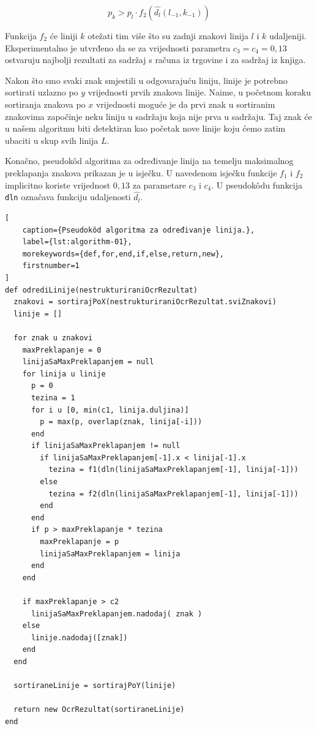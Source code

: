 \documentclass[times, utf8, zavrsni]{fer}
\begin{document}
\begin{equation}
    p_k > p_l \cdot f_2(\hat{d_l}(l_{-1},k_{-1}))
\end{equation}

Funkcija $f_2$ će liniji $k$ otežati tim više što su zadnji znakovi linija
$l$ i $k$ udaljeniji. Eksperimentalno je utvrđeno da se za vrijednosti parametra
$c_3 = c_4 = 0{,}13$ ostvaruju najbolji rezultati za sadržaj s računa iz
trgovine i za sadržaj iz knjiga.

Nakon što smo svaki znak smjestili u odgovarajuću liniju, linije je potrebno
sortirati uzlazno po $y$ vrijednosti prvih znakova linije. Naime, u početnom
koraku sortiranja znakova po $x$ vrijednosti moguće je da prvi znak
u sortiranim znakovima započinje neku liniju u sadržaju koja nije prva u sadržaju. Taj znak će u našem algoritmu biti detektiran kao početak nove linije koju ćemo zatim ubaciti u skup svih linija $L$.

Konačno, pseudokôd algoritma za određivanje linija na temelju maksimalnog
preklapanja znakova prikazan je u isječku. U navedenom isječku funkcije $f_1$ i
$f_2$ implicitno koriste vrijednost $0{,}13$ za parametare $c_3$ i $c_4$.
U pseudokôdu funkcija \lstinline{dln} označava funkciju udaljenosti $\hat{d_l}$.

\begin{lstlisting}[
    caption={Pseudokôd algoritma za određivanje linija.},
    label={lst:algorithm-01},
    morekeywords={def,for,end,if,else,return,new},
    firstnumber=1
]
def odrediLinije(nestrukturiraniOcrRezultat)
  znakovi = sortirajPoX(nestrukturiraniOcrRezultat.sviZnakovi)
  linije = []

  for znak u znakovi
    maxPreklapanje = 0
    linijaSaMaxPreklapanjem = null
    for linija u linije
      p = 0
      tezina = 1
      for i u [0, min(c1, linija.duljina)]
        p = max(p, overlap(znak, linija[-i]))
      end
      if linijaSaMaxPreklapanjem != null
        if linijaSaMaxPreklapanjem[-1].x < linija[-1].x
          tezina = f1(dln(linijaSaMaxPreklapanjem[-1], linija[-1]))
        else
          tezina = f2(dln(linijaSaMaxPreklapanjem[-1], linija[-1]))
        end
      end
      if p > maxPreklapanje * tezina
        maxPreklapanje = p
        linijaSaMaxPreklapanjem = linija
      end
    end

    if maxPreklapanje > c2
      linijaSaMaxPreklapanjem.nadodaj( znak )
    else
      linije.nadodaj([znak])
    end
  end

  sortiraneLinije = sortirajPoY(linije)

  return new OcrRezultat(sortiraneLinije)
end
\end{lstlisting}
\end{document}
